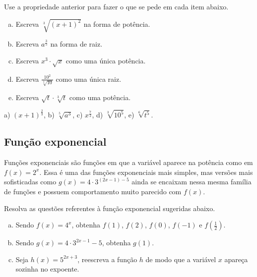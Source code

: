 \documentclass[main.tex]{subfiles}
\begin{document}
\begin{questao}
 Use a propriedade anterior para fazer o que se pede em cada item abaixo.
\begin{enumerate}[a)]
\item Escreva $\sqrt[3]{(x+1)^2}$ na forma de potência.
\item Escreva  $a^{\frac{3}{5}}$ na forma de raiz.
\item Escreva $x^3 \cdot \sqrt{x}$ como uma única potência.
\item Escreva $\frac{10^2}{\sqrt[3]{10}}$ como uma única raiz.
\item Escreva $\sqrt{t} \cdot \sqrt[3]{t}$ como uma potência.
\end{enumerate}
\end{questao}

\begin{gabarito}
	\begin{gabaritoQuestao}
		a) $(x+1)^{\frac{2}{3}}$, b) $\sqrt[5]{a^3}$, c) $x^{\frac{7}{2}}$, d) $\sqrt[3]{10^5}$, e) $\sqrt[6]{t^5}$.
	\end{gabaritoQuestao}
\end{gabarito}

\subsection*{Função exponencial}

Funções exponenciais são funções em que a variável aparece na potência como em $f(x)=2^x$. Essa é uma das funções exponenciais mais simples, mas versões mais sofisticadas como $g(x)=4 \cdot 3^{(2x-1)-5}$ ainda se encaixam nessa mesma família de funções e possuem comportamento muito parecido com $f(x)$.

\begin{questao}
 Resolva as questões referentes à função exponencial sugeridas abaixo.
\begin{enumerate}[a)]
\item Sendo $f(x)=4^x$, obtenha $f(1)$, $f(2)$, $f(0)$, $f(-1)$ e $f(\frac{1}{2})$.
\item Sendo $g(x)=4 \cdot 3^{2x-1}-5$, obtenha $g(1)$.
\item Seja $h(x)=5^{2x+3}$, reescreva a função $h$ de modo que a variável $x$ apareça sozinha no expoente.
\end{enumerate}
\end{questao}
\end{document}
